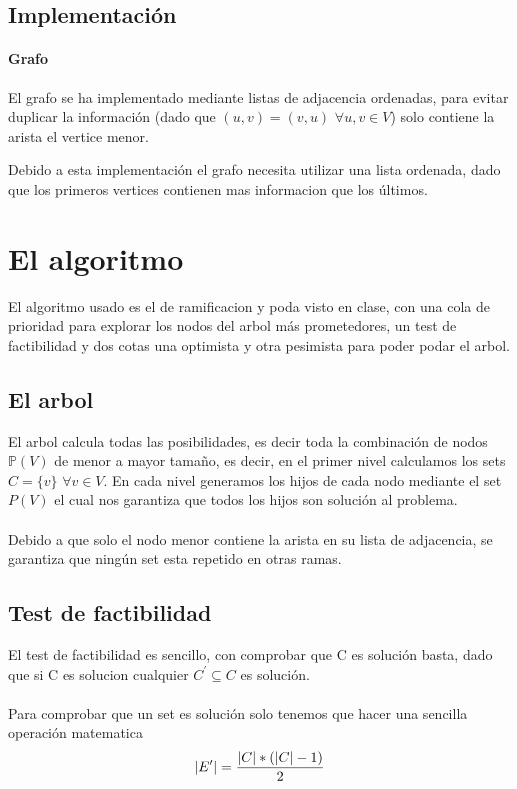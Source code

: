 \documentclass{article}
\DeclarePairedDelimiter\abs{\lvert}{\rvert}%
\begin{document}
\subsection{Implementación}

\paragraph{Grafo} El grafo se ha implementado mediante listas de adjacencia ordenadas, para evitar duplicar la información (dado que $(u, v) = (v, u)$ $\forall u, v \in V$)
solo contiene la arista el vertice menor.

Debido a esta implementación el grafo necesita utilizar una lista ordenada, dado que los primeros vertices contienen mas informacion que los últimos.
\section{El algoritmo}
El algoritmo usado es el de ramificacion y poda visto en clase, con una cola de prioridad para explorar los nodos del arbol más prometedores, un test de factibilidad y dos cotas una optimista y otra pesimista para poder podar el arbol.
\subsection{El arbol}
El arbol calcula todas las posibilidades, es decir toda la combinación de nodos $\mathbb{P}(V)$ de menor a mayor tamaño, es decir, en el primer nivel calculamos los sets $C = \{v\}$ $\forall v \in V$. 
En cada nivel generamos los hijos de cada nodo mediante el set $P(V)$ el cual nos garantiza que todos los hijos son solución al problema. 
\paragraph{} Debido a que solo el nodo menor contiene la arista en su lista de adjacencia, se garantiza que ningún set esta repetido en otras ramas.
\subsection{Test de factibilidad}
El test de factibilidad es sencillo, con comprobar que C es solución basta, dado que si C es solucion cualquier $C^\prime \subseteq C$ es solución.
\paragraph{} Para comprobar que un set es solución solo tenemos que hacer una sencilla operación matematica 
\[ \abs{E^\prime} = \dfrac{\abs{C} * (\abs{C} - 1)}{2} \]
\end{document}
